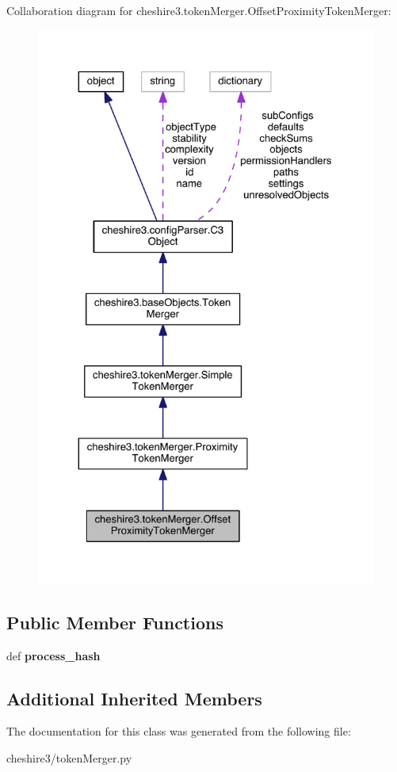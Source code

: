 Collaboration diagram for cheshire3.\-token\-Merger.\-Offset\-Proximity\-Token\-Merger\-:
\nopagebreak
\begin{figure}[H]
\begin{center}
\leavevmode
\includegraphics[width=325pt]{classcheshire3_1_1token_merger_1_1_offset_proximity_token_merger__coll__graph}
\end{center}
\end{figure}
\subsection*{Public Member Functions}
\begin{DoxyCompactItemize}
\item 
\hypertarget{classcheshire3_1_1token_merger_1_1_offset_proximity_token_merger_ae44939ad0a86ff03f5ce5bca586208e8}{def {\bfseries process\-\_\-hash}}\label{classcheshire3_1_1token_merger_1_1_offset_proximity_token_merger_ae44939ad0a86ff03f5ce5bca586208e8}

\end{DoxyCompactItemize}
\subsection*{Additional Inherited Members}


The documentation for this class was generated from the following file\-:\begin{DoxyCompactItemize}
\item 
cheshire3/token\-Merger.\-py\end{DoxyCompactItemize}
